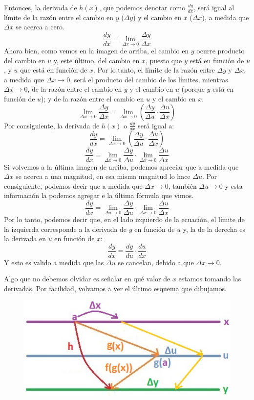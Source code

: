 \documentclass[12pt]{article}
\begin{document}
Entonces, la derivada de $h(x)$, que podemos denotar como $\frac{dy}{dx}$, será igual al límite de la razón entre el cambio en $y$ ($\Delta y$) y el cambio en $x$ ($\Delta x$), a medida que $\Delta x$ se acerca a cero.
\[\frac{dy}{dx} = \lim_{\Delta x \to 0} \frac{\Delta y}{\Delta x}\]
Ahora bien, como vemos en la imagen de arriba, el cambio en $y$ ocurre producto del cambio en $u$ y, este último, del cambio en $x$, puesto que $y$ está en función de $u$, y $u$ que está en función de $x$. Por lo tanto, el límite de la razón entre $\Delta y$ y $\Delta x$, a medida que $\Delta x \to 0$, será el producto del cambio de los límites, mientras $\Delta x \to 0$, de la razón entre el cambio en $y$ y el cambio en $u$ (porque $y$ está en función de $u$); y de la razón entre el cambio en $u$ y el cambio en $x$.
\[\lim_{\Delta x \to 0} \frac{\Delta y}{\Delta x} = \lim_{\Delta x \to 0} \left(\frac{\Delta y}{\Delta u} \cdot \frac{\Delta u}{\Delta x}\right)\]
Por consiguiente, la derivada de $h(x)$ o $\frac{dy}{dx}$ será igual a:
\[\frac{dy}{dx} = \lim_{\Delta x \to 0} \left(\frac{\Delta y}{\Delta u} \cdot \frac{\Delta u}{\Delta x}\right)\]
\[\frac{dy}{dx} = \lim_{\Delta x \to 0} \frac{\Delta y}{\Delta u} \cdot \lim_{\Delta x \to 0} \frac{\Delta u}{\Delta x}\]
Si volvemos a la última imagen de arriba, podemos apreciar que a medida que $\Delta x$ se acerca a una magnitud, en esa misma magnitud lo hace $\Delta u$. Por consiguiente, podemos decir que a medida que $\Delta x \to 0$, también $\Delta u \to 0$ y esta información la podemos agregar e la última fórmula que vimos.
\[\frac{dy}{dx} = \lim_{\Delta u \to 0} \frac{\Delta y}{\Delta u} \cdot \lim_{\Delta x \to 0} \frac{\Delta u}{\Delta x}\]
Por lo tanto, podemos decir que, en el lado izquierdo de la ecuación, el límite de la izquierda corresponde a la derivada de $y$ en función de $u$ y, la de la derecha es la derivada en $u$ en función de $x$:
\[\frac{dy}{dx} = \frac{dy}{du} \cdot \frac{du}{dx}\]
Y esto es valido a medida que las $\Delta u$ se cancelan, debido a que $\Delta x \to 0$.

Algo que no debemos olvidar es señalar en qué valor de $x$ estamos tomando las derivadas. Por facilidad, volvamos a ver el último esquema que dibujamos.

\newpage

\begin{figure}[hbt!]
\centering
\includegraphics[scale=0.7]{img/intro-chain-rule-4.jpg}
\end{figure}
\end{document}
